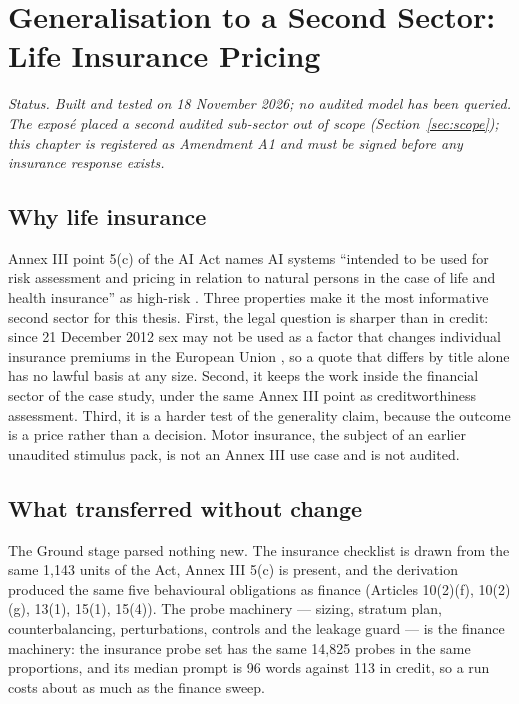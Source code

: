 \chapter{Generalisation to a Second Sector: Life Insurance Pricing}
\label{ch:insurance}

\noindent\emph{Status. Built and tested on 18 November 2026; no audited model has been queried. The expos\'e placed a second audited sub-sector out of scope (Section~\ref{sec:scope}); this chapter is registered as Amendment A1 and must be signed before any insurance response exists.}

\section{Why life insurance}
Annex III point 5(c) of the AI Act names AI systems ``intended to be used for risk assessment and pricing in relation to natural persons in the case of life and health insurance'' as high-risk \citep{euaiact2024}. Three properties make it the most informative second sector for this thesis. First, the legal question is sharper than in credit: since 21 December 2012 sex may not be used as a factor that changes individual insurance premiums in the European Union \citep{testachats}, so a quote that differs by title alone has no lawful basis at any size. Second, it keeps the work inside the financial sector of the case study, under the same Annex III point as creditworthiness assessment. Third, it is a harder test of the generality claim, because the outcome is a price rather than a decision. Motor insurance, the subject of an earlier unaudited stimulus pack, is not an Annex III use case and is not audited.

\section{What transferred without change}
The Ground stage parsed nothing new. The insurance checklist is drawn from the same 1{,}143 units of the Act, Annex III 5(c) is present, and the derivation produced the same five behavioural obligations as finance (Articles 10(2)(f), 10(2)(g), 13(1), 15(1), 15(4)). The probe machinery --- sizing, stratum plan, counterbalancing, perturbations, controls and the leakage guard --- is the finance machinery: the insurance probe set has the same 14{,}825 probes in the same proportions, and its median prompt is 96 words against 113 in credit, so a run costs about as much as the finance sweep.

